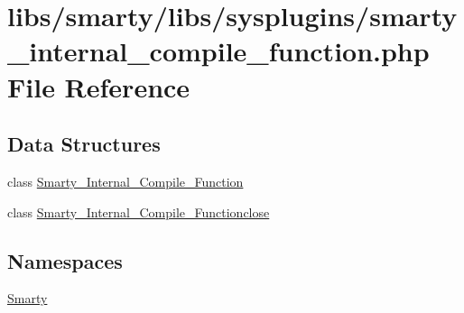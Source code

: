 \hypertarget{smarty__internal__compile__function_8php}{}\section{libs/smarty/libs/sysplugins/smarty\+\_\+internal\+\_\+compile\+\_\+function.php File Reference}
\label{smarty__internal__compile__function_8php}
\subsection*{Data Structures}
\begin{DoxyCompactItemize}
\item 
class \hyperlink{class_smarty___internal___compile___function}{Smarty\+\_\+\+Internal\+\_\+\+Compile\+\_\+\+Function}
\item 
class \hyperlink{class_smarty___internal___compile___functionclose}{Smarty\+\_\+\+Internal\+\_\+\+Compile\+\_\+\+Functionclose}
\end{DoxyCompactItemize}
\subsection*{Namespaces}
\begin{DoxyCompactItemize}
\item 
 \hyperlink{namespace_smarty}{Smarty}
\end{DoxyCompactItemize}
